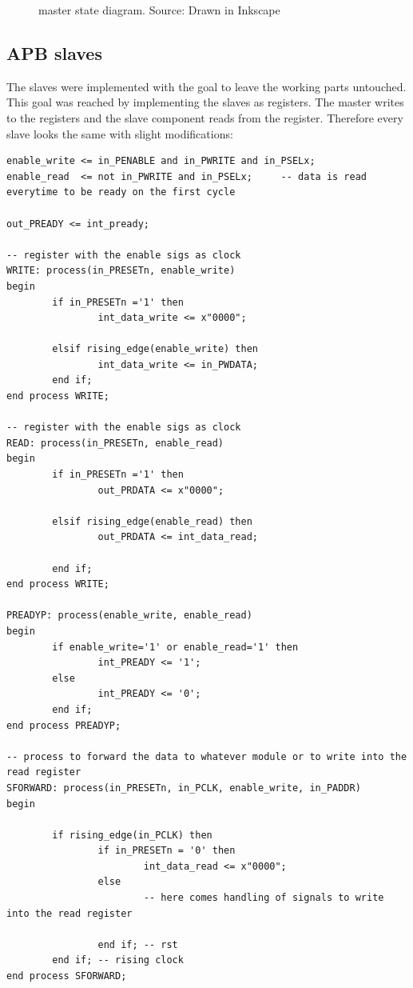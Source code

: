 \begin{figure}[ht]
    \centering
    \caption{master state diagram. Source: Drawn in Inkscape}
    \label{fig:mst-state}
\end{figure}


\subsection{APB slaves}
The slaves were implemented with the goal to leave the working
parts untouched. This goal was reached by implementing the
slaves as registers. The master writes to the registers and
the slave component reads from the register. Therefore every
slave looks the same with slight modifications:

\lstset{style=vhdl}
\begin{lstlisting}
enable_write <= in_PENABLE and in_PWRITE and in_PSELx;
enable_read  <= not in_PWRITE and in_PSELx;     -- data is read everytime to be ready on the first cycle

out_PREADY <= int_pready;

-- register with the enable sigs as clock
WRITE: process(in_PRESETn, enable_write)
begin
        if in_PRESETn ='1' then
                int_data_write <= x"0000";

        elsif rising_edge(enable_write) then
                int_data_write <= in_PWDATA;
        end if;
end process WRITE;

-- register with the enable sigs as clock
READ: process(in_PRESETn, enable_read)
begin
        if in_PRESETn ='1' then
                out_PRDATA <= x"0000";

        elsif rising_edge(enable_read) then
                out_PRDATA <= int_data_read;

        end if;
end process WRITE;

PREADYP: process(enable_write, enable_read)
begin
        if enable_write='1' or enable_read='1' then
                int_PREADY <= '1';
        else
                int_PREADY <= '0';
        end if;
end process PREADYP;

-- process to forward the data to whatever module or to write into the read register
SFORWARD: process(in_PRESETn, in_PCLK, enable_write, in_PADDR)
begin

        if rising_edge(in_PCLK) then
                if in_PRESETn = '0' then
                        int_data_read <= x"0000";
                else
                        -- here comes handling of signals to write into the read register

                end if; -- rst
        end if; -- rising clock
end process SFORWARD;
\end{lstlisting}

